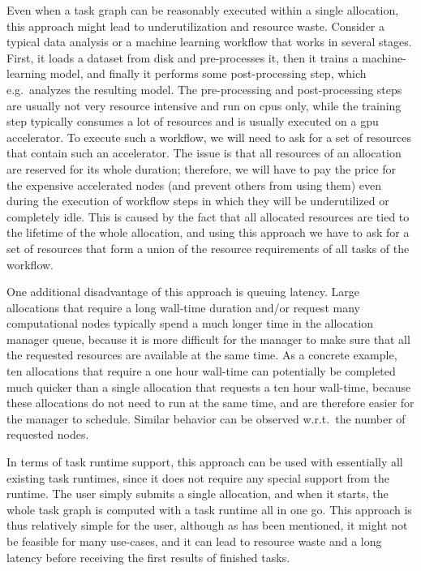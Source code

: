 Even when a task graph can be reasonably executed within a single allocation, this approach might
lead to underutilization and resource waste. Consider a typical data analysis or a machine learning
workflow that works in several stages. First, it loads a dataset from disk and pre-processes it,
then it trains a machine-learning model, and finally it performs some post-processing step, which
e.g.\ analyzes the resulting model. The pre-processing and post-processing steps are usually not
very resource intensive and run on \glspl{cpu} only, while the training step
typically consumes a lot of resources and is usually executed on a \gls{gpu}
accelerator. To execute such a workflow, we will need to ask for a set of resources that contain
such an accelerator. The issue is that all resources of an allocation are reserved for its whole
duration; therefore, we will have to pay the price for the expensive accelerated nodes (and prevent
others from using them) even during the execution of workflow steps in which they will be
underutilized or completely idle. This is caused by the fact that all allocated resources are tied
to the lifetime of the whole allocation, and using this approach we have to ask for a set of
resources that form a union of the resource requirements of all tasks of the workflow.

One additional disadvantage of this approach is queuing latency. Large allocations that require a
long wall-time duration and/or request many computational nodes typically spend a much longer time
in the allocation manager queue, because it is more difficult for the manager to make sure that all
the requested resources are available at the same time. As a concrete example, ten allocations that
require a one hour wall-time can potentially be completed much quicker than a single allocation
that requests a ten hour wall-time, because these allocations do not need to run at the same time,
and are therefore easier for the manager to schedule. Similar behavior can be observed w.r.t.\ the
number of requested nodes.

In terms of task runtime support, this approach can be used with essentially all existing task
runtimes, since it does not require any special support from the runtime. The user simply submits a
single allocation, and when it starts, the whole task graph is computed with a task runtime all in
one go. This approach is thus relatively simple for the user, although as has been mentioned, it
might not be feasible for many use-cases, and it can lead to resource waste and a long latency
before receiving the first results of finished tasks.

